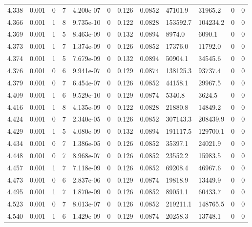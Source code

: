 \documentclass[preview]{standalone}
\begin{document}
{{{{{\begin{tabular}{L{1.2cm}C{1.2cm} C{0.3cm}C{0.5cm} C{1.4cm}C{1.4cm} C{1.4cm}C{1.4cm} C{1.6cm}C{1.6cm} C{1.6cm}C{1.6cm}}
  4.338  &  0.001  & 0     &  7 &  4.200e-07  & 0  &  0.126&   0.0852& 47101.9 & 31965.2   &  0 & 0  \\ 
  4.366  &  0.001  & 1     &  8 &  9.735e-10  & 0  &  0.122&   0.0828& 153592.7 & 104234.2   &  0 & 0  \\ 
  4.369  &  0.001  & 1     &  5 &  8.463e-09  & 0  &  0.132&   0.0894& 8974.0 & 6090.1   &  0 & 0  \\ 
  4.373  &  0.001  & 1     &  7 &  1.374e-09  & 0  &  0.126&   0.0852& 17376.0 & 11792.0   &  0 & 0  \\ 
  4.374  &  0.001  & 1     &  5 &  7.679e-09  & 0  &  0.132&   0.0894& 50904.1 & 34545.6   &  0 & 0  \\ 
  4.376  &  0.001  & 0     &  6 &  9.941e-07  & 0  &  0.129&   0.0874& 138125.3 & 93737.4   &  0 & 0  \\ 
  4.379  &  0.001  & 0     &  7 &  6.454e-07  & 0  &  0.126&   0.0852& 44158.1 & 29967.5   &  0 & 0  \\ 
  4.409  &  0.001  & 1     &  6 &  9.529e-10  & 0  &  0.129&   0.0874& 5340.8 & 3624.5   &  0 & 0  \\ 
  4.416  &  0.001  & 1     &  8 &  4.135e-09  & 0  &  0.122&   0.0828& 21880.8 & 14849.2   &  0 & 0  \\ 
  4.424  &  0.001  & 0     &  7 &  2.340e-05  & 0  &  0.126&   0.0852& 307143.3 & 208439.9   &  0 & 0  \\ 
  4.429  &  0.001  & 1     &  5 &  4.080e-09  & 0  &  0.132&   0.0894& 191117.5 & 129700.1   &  0 & 0  \\ 
  4.434  &  0.001  & 0     &  7 &  1.386e-05  & 0  &  0.126&   0.0852& 35397.1 & 24021.9   &  0 & 0  \\ 
  4.448  &  0.001  & 0     &  7 &  8.968e-07  & 0  &  0.126&   0.0852& 23552.2 & 15983.5   &  0 & 0  \\ 
  4.457  &  0.001  & 1     &  7 &  7.118e-09  & 0  &  0.126&   0.0852& 69208.4 & 46967.6   &  0 & 0  \\ 
  4.473  &  0.001  & 0     &  6 &  2.837e-06  & 0  &  0.129&   0.0874& 19818.9 & 13449.9   &  0 & 0  \\ 
  4.495  &  0.001  & 1     &  7 &  1.870e-09  & 0  &  0.126&   0.0852& 89051.1 & 60433.7   &  0 & 0  \\ 
  4.523  &  0.001  & 0     &  7 &  8.013e-07  & 0  &  0.126&   0.0852& 219211.1 & 148765.5   &  0 & 0  \\ 
  4.540  &  0.001  & 1     &  6 &  1.429e-09  & 0  &  0.129&   0.0874& 20258.3 & 13748.1   &  0 & 0  \\ 

\end{tabular}}}}}}
\end{document}
